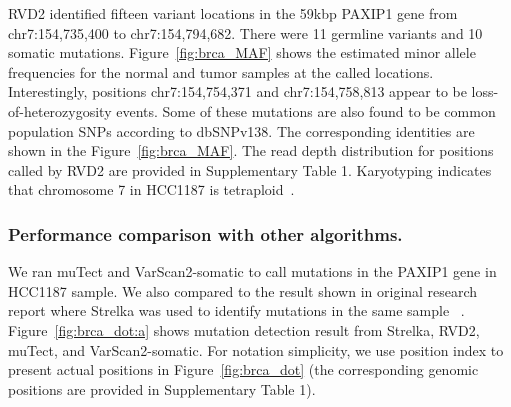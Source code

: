 \documentclass{bioinfo}
\begin{document}
RVD2 identified fifteen variant locations in the 59kbp PAXIP1 gene from chr7:154,735,400 to chr7:154,794,682. There were 11 germline variants and 10 somatic mutations. %
Figure~\ref{fig:brca_MAF} shows the estimated minor allele frequencies for the normal and tumor samples at the called locations. 
%
% 
Interestingly, positions chr7:154,754,371 and chr7:154,758,813 appear to be loss-of-heterozygosity events. 
Some of these mutations are also found to be common population SNPs according to dbSNPv138. 
The corresponding identities are shown in the Figure~\ref{fig:brca_MAF}. The read depth distribution for positions called by RVD2 are provided in Supplementary Table 1. 
Karyotyping indicates that chromosome 7 in HCC1187 is tetraploid~\citep{tetraploid}.

\subsubsection{Performance comparison with other algorithms.}

We ran muTect and VarScan2-somatic to call mutations in the PAXIP1 gene in HCC1187 sample. We also compared to the result shown in original research report where Strelka was used to identify mutations in the same sample ~\citep{hcc1187techreport}. Figure~\ref{fig:brca_dot:a} shows mutation detection result from Strelka, RVD2, muTect, and VarScan2-somatic. For notation simplicity, we use position index to present actual positions in Figure~\ref{fig:brca_dot} (the corresponding genomic positions are provided in Supplementary Table 1). 
\end{document}

